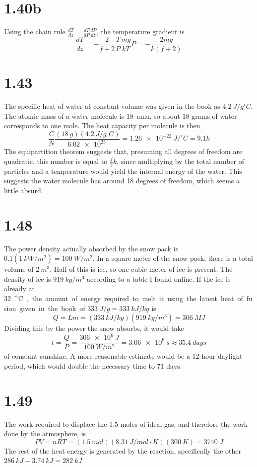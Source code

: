 \documentclass{article}
\begin{document}
\section*{1.40b}
Using the chain rule $\frac{dT}{dz}=\frac{dT}{dP}\frac{dP}{dz}$, the temperature gradient is
\[\frac{dT}{dz}=-\frac{2}{f+2}\frac{T}{P}\frac{mg}{kT}P=-\frac{2mg}{k(f+2)}\]

\section*{1.43}
The specific heat of water at constant volume was given in the book as $\SI{4.2}{J/g^\circ C }$. The atomic mass of a water molecule is \SI{18}{amu}, so about 18 grams of water corresponds to one mole. The heat capacity per molecule is then
\[\frac{C}{N}\frac{(\SI{18}{g})(\SI{4.2}{J/g^\circ C})}{\SI{6.02e23}{}}=\SI{1.26e-22}{J/^\circ C}=9.1k\]
The equipartition theorem suggests that, presuming all degrees of freedom are quadratic, this number is equal to $\frac{f}{2}k$, since multiplying by the total number of particles and a temperature would yield the internal energy of the water. This suggests the water molecule has around 18 degrees of freedom, which seems a little absurd.

\section*{1.48}
The power density actually absorbed by the snow pack is $0.1(\SI{1}{kW/m^2})=\SI{100}{W/m^2}$. In a square meter of the snow pack, there is a total volume of $\SI{2}{m^3}$. Half of this is ice, so one cubic meter of ice is present. The density of ice is $\SI{919}{kg/m^3}$ according to a table I found online. If the ice is already at \SI{32}{^\circ C}, the amount of energy required to melt it using the latent heat of fusion given in the book of $\SI{333}{J/g}=\SI{333}{kJ/kg}$ is
\[Q=Lm={(\SI{333}{kJ/kg})}{(\SI{919}{kg/m^3})}=\SI{306}{MJ}\]
Dividing this by the power the snow absorbs, it would take
\[t=\frac{Q}{P}=\frac{\SI{306e6}{J}}{\SI{100}{W/m^2}}=\SI{3.06e6}{s}\approx \SI{35.4}{days}\]
of constant sunshine. A more reasonable estimate would be a 12-hour daylight period, which would double the necessary time to 71 days.

\section*{1.49}
The work required to displace the 1.5 moles of ideal gas, and therefore the work done by the atmosphere, is
\[PV={nRT}={(\SI{1.5}{mol})(\SI{8.31}{J/mol\cdot K})(\SI{300}{K})}=\SI{3740}{J}\]
The rest of the heat energy is generated by the reaction, specifically the other $\SI{286}{kJ}-\SI{3.74}{kJ}=\SI{282}{kJ}$
\end{document}
